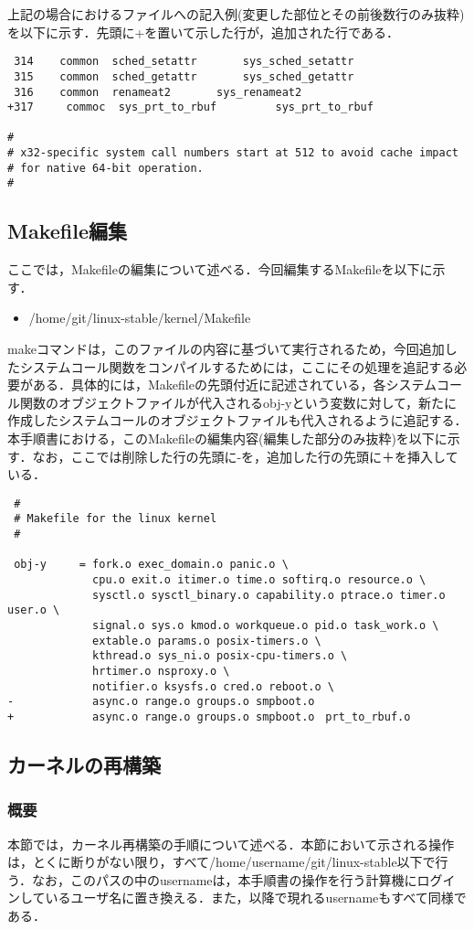 \documentclass[12pt]{jsarticle}
\begin{document}
上記の場合におけるファイルへの記入例(変更した部位とその前後数行のみ抜粋)を以下に示す．先頭に+を置いて示した行が，追加された行である．
\begin{verbatim}
 314	common	sched_setattr		sys_sched_setattr
 315	common	sched_getattr		sys_sched_getattr
 316	common	renameat2		sys_renameat2
+317     commoc  sys_prt_to_rbuf         sys_prt_to_rbuf

#
# x32-specific system call numbers start at 512 to avoid cache impact
# for native 64-bit operation.
#
\end{verbatim}
\subsection{Makefile編集}
ここでは，Makefileの編集について述べる．今回編集するMakefileを以下に示す．
\begin{itemize}
\item \slash{}home\slash{}git\slash{}linux-stable\slash{}kernel\slash{}Makefile
\end{itemize}
makeコマンドは，このファイルの内容に基づいて実行されるため，今回追加したシステムコール関数をコンパイルするためには，ここにその処理を追記する必要がある．具体的には，Makefileの先頭付近に記述されている，各システムコール関数のオブジェクトファイルが代入されるobj-yという変数に対して，新たに作成したシステムコールのオブジェクトファイルも代入されるように追記する．本手順書における，このMakefileの編集内容(編集した部分のみ抜粋)を以下に示す．なお，ここでは削除した行の先頭に-を，追加した行の先頭に＋を挿入している．

\begin{verbatim}
 #
 # Makefile for the linux kernel
 #

 obj-y     = fork.o exec_domain.o panic.o \
             cpu.o exit.o itimer.o time.o softirq.o resource.o \
             sysctl.o sysctl_binary.o capability.o ptrace.o timer.o user.o \
             signal.o sys.o kmod.o workqueue.o pid.o task_work.o \
             extable.o params.o posix-timers.o \
             kthread.o sys_ni.o posix-cpu-timers.o \
             hrtimer.o nsproxy.o \
             notifier.o ksysfs.o cred.o reboot.o \
-            async.o range.o groups.o smpboot.o
+            async.o range.o groups.o smpboot.o　prt_to_rbuf.o
\end{verbatim}

\subsection{カーネルの再構築}
\subsubsection{概要}
本節では，カーネル再構築の手順について述べる．本節において示される操作は，とくに断りがない限り，すべて/home/username/git/linux-stable以下で行う．なお，このパスの中のusernameは，本手順書の操作を行う計算機にログインしているユーザ名に置き換える．また，以降で現れるusernameもすべて同様である．
\end{document}
